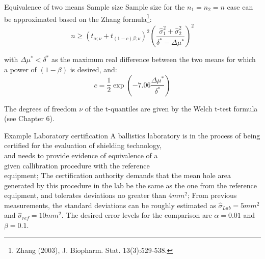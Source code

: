 \documentclass[t]{beamer}
\begin{document}

\begin{ftst}
{Equivalence of two means}
{Sample size}
Sample size for the $n_1 = n_2 = n$ case can be approximated based on the Zhang formula\footnote[1]{\tiny Zhang (2003), J. Biopharm. Stat. 13(3):529-538.}:
$$n \geq \left(t_{\alpha;\nu}+t_{(1-c)\beta;\nu}\right)^2\left(\frac{\hat{\sigma}_1^2+\hat{\sigma}_2^2}{\delta^*-\Delta\mu^*}\right)^2$$

\noindent with $\Delta\mu^*<\delta^*$ as the maximum real difference between the two means for which a power of $(1-\beta)$ is desired, and:
$$c = \frac{1}{2}\exp\left(-7.06\frac{\Delta\mu^*}{\delta^*}\right)$$

The degrees of freedom $\nu$ of the t-quantiles are given by the Welch t-test formula (see Chapter 6).
\end{ftst}


\begin{ftst}
{Example}
{Laboratory certification}
A ballistics laboratory is in the process of being\\
certified for the evaluation of shielding technology,\\
and needs to provide evidence of equivalence of a\\
given callibration procedure with the reference\\equipment;
\vone
The certification authority demands that the mean hole area generated by this procedure in the lab be the same as the one from the reference equipment, and tolerates deviations no greater than $4 mm^2$;
\vone
From previous measurements, the standard deviations can be roughly estimated as $\hat{\sigma}_{Lab} = 5 mm^2$ and $\hat{\sigma}_{ref} = 10 mm^2$.
\vone
The desired error levels for the comparison are $\alpha=0.01$ and $\beta = 0.1$.

\end{ftst}
\end{document}
